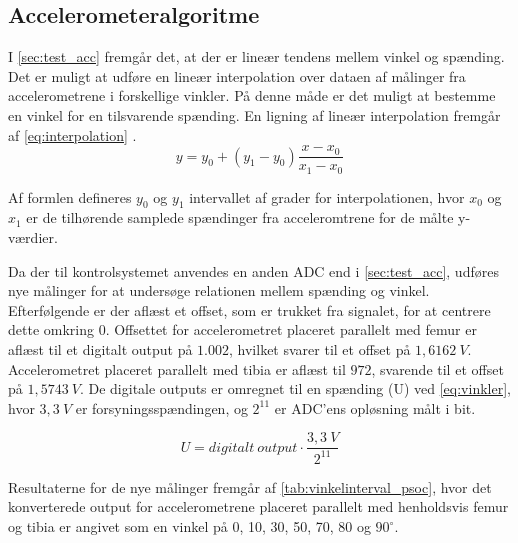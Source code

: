 \subsection{Accelerometeralgoritme}\label{sec:imp_vinkler}
I \autoref{sec:test_acc} fremgår det, at der er lineær tendens mellem vinkel og spænding. Det er muligt at udføre en lineær interpolation over dataen af målinger fra accelerometrene i forskellige vinkler. På denne måde er det muligt at bestemme en vinkel for en tilsvarende spænding. En ligning af lineær interpolation fremgår af \autoref{eq:interpolation} \citep{samarin2012}.
\begin{equation} \label{eq:interpolation}
y=y_{0}+(y_{1}-y_{0})\dfrac{x-x_{0}}{x_{1}-x_{0}}
\end{equation}

\noindent
Af formlen defineres $y_0$ og $y_1$ intervallet af grader for interpolationen, hvor $x_0$ og $x_1$ er de tilhørende samplede spændinger fra acceleromtrene for de målte y-værdier.   

Da der til kontrolsystemet anvendes en anden ADC end i \autoref{sec:test_acc}, udføres nye målinger for at undersøge relationen mellem spænding og vinkel.  
Efterfølgende er der aflæst et offset, som er trukket fra signalet, for at centrere dette omkring 0. Offsettet for accelerometret placeret parallelt med femur er aflæst til et digitalt output på $1.002$, hvilket svarer til et offset på $1,6162~V$. Accelerometret placeret parallelt med tibia er aflæst til $972$, svarende til et offset på $1,5743~V$. De digitale outputs er omregnet til en spænding (U) ved \autoref{eq:vinkler}, hvor $3,3~V$ er forsyningsspændingen, og $2^{11}$ er ADC'ens opløsning målt i bit.  

\begin{equation}
\label{eq:vinkler}
U = digitalt~output\cdot \dfrac{3,3~V}{2^{11}}
\end{equation}

\noindent
Resultaterne for de nye målinger fremgår af \autoref{tab:vinkelinterval_psoc}, hvor det konverterede output for accelerometrene placeret parallelt med henholdsvis femur og tibia er angivet som en vinkel på 0, 10, 30, 50, 70, 80 og $90^{\circ}$. 

